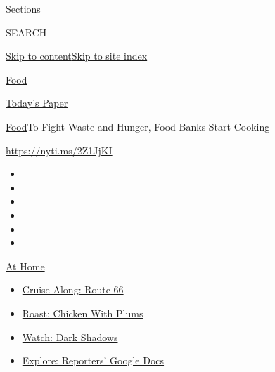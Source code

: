 Sections

SEARCH

\protect\hyperlink{site-content}{Skip to
content}\protect\hyperlink{site-index}{Skip to site index}

\href{https://www.nytimes3xbfgragh.onion/section/food}{Food}

\href{https://myaccount.nytimes3xbfgragh.onion/auth/login?response_type=cookie\&client_id=vi}{}

\href{https://www.nytimes3xbfgragh.onion/section/todayspaper}{Today's
Paper}

\href{/section/food}{Food}\textbar{}To Fight Waste and Hunger, Food
Banks Start Cooking

\url{https://nyti.ms/2Z1JjKI}

\begin{itemize}
\item
\item
\item
\item
\item
\item
\end{itemize}

\href{https://www.nytimes3xbfgragh.onion/spotlight/at-home?action=click\&pgtype=Article\&state=default\&region=TOP_BANNER\&context=at_home_menu}{At
Home}

\begin{itemize}
\tightlist
\item
  \href{https://www.nytimes3xbfgragh.onion/2020/09/07/travel/route-66.html?action=click\&pgtype=Article\&state=default\&region=TOP_BANNER\&context=at_home_menu}{Cruise
  Along: Route 66}
\item
  \href{https://www.nytimes3xbfgragh.onion/2020/09/04/dining/sheet-pan-chicken.html?action=click\&pgtype=Article\&state=default\&region=TOP_BANNER\&context=at_home_menu}{Roast:
  Chicken With Plums}
\item
  \href{https://www.nytimes3xbfgragh.onion/2020/09/04/arts/television/dark-shadows-stream.html?action=click\&pgtype=Article\&state=default\&region=TOP_BANNER\&context=at_home_menu}{Watch:
  Dark Shadows}
\item
  \href{https://www.nytimes3xbfgragh.onion/interactive/2020/at-home/even-more-reporters-editors-diaries-lists-recommendations.html?action=click\&pgtype=Article\&state=default\&region=TOP_BANNER\&context=at_home_menu}{Explore:
  Reporters' Google Docs}
\end{itemize}

